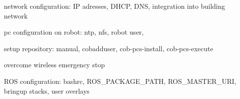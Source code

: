 \documentclass[12pt,twoside]{report}
\begin{document}
network configuration: IP adresses, DHCP, DNS, integration into building network

pc configuration on robot: ntp, nfs, robot user, 

setup repository: manual, cobadduser, cob-pcs-install, cob-pcs-execute

overcome wireless emergency stop

ROS configuration: bashrc, ROS\_PACKAGE\_PATH, ROS\_MASTER\_URI, bringup stacks, user overlays
\end{document}
